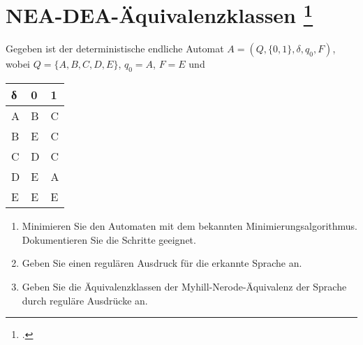 \documentclass{lehramt-informatik-aufgabe}
\begin{document}
\section{NEA-DEA-Äquivalenzklassen
\footcite{theoinf:ab:1}}

Gegeben ist der deterministische endliche Automat $A = (Q, \{0, 1\},
\delta, q_0 , F)$, wobei $Q = \{A, B, C, D, E\}$, $q_0 = A$, $F = {E}$ und

\begin{center}
\begin{tabular}{l||l|l}
δ & 0 & 1 \\\hline\hline
A & B & C \\\hline
B & E & C \\\hline
C & D & C \\\hline
D & E & A \\\hline
E & E & E \\\hline
\end{tabular}
\end{center}

\begin{enumerate}
\item Minimieren Sie den Automaten mit dem bekannten
Minimierungsalgorithmus. Dokumentieren Sie die Schritte geeignet.

\item Geben Sie einen regulären Ausdruck für die erkannte Sprache an.

\item Geben Sie die Äquivalenzklassen der Myhill-Nerode-Äquivalenz der
Sprache durch reguläre Ausdrücke an.
\end{enumerate}
\end{document}
